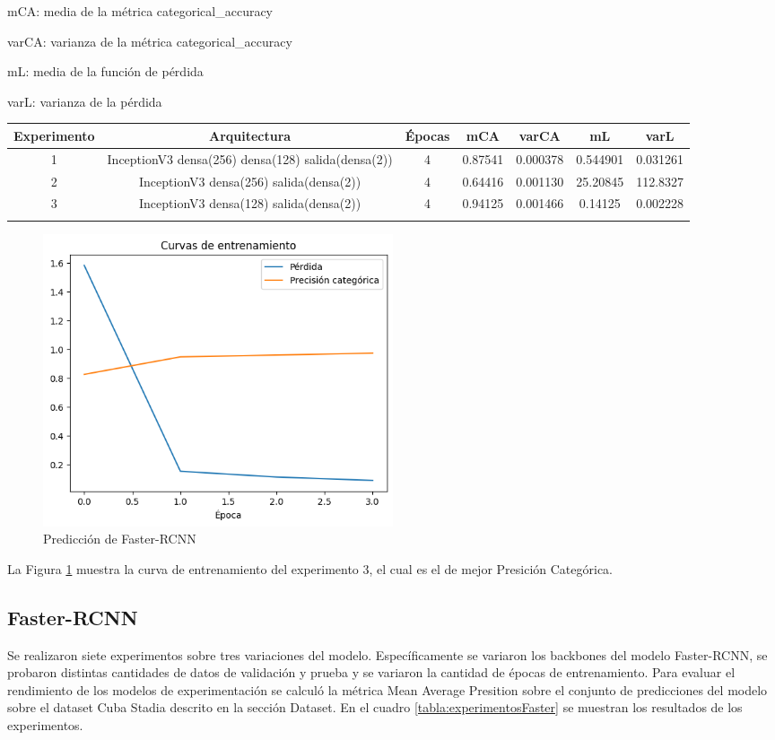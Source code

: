 \documentclass[article]{llncs}
\begin{document}
mCA: media de la métrica categorical\_accuracy

varCA: varianza de la métrica categorical\_accuracy  

mL: media de la función de pérdida

varL: varianza de la pérdida

\begin{table}[h]
    \centering
    \begin{tabular}{|c|c|c|c|c|c|c|}
    \hline
    Experimento & Arquitectura & Épocas & mCA & varCA & mL & varL \\
    \hline
    1 & InceptionV3 densa(256) densa(128) salida(densa(2)) & 4 & 0.87541 & 0.000378 & 0.544901 & 0.031261 \\
    2 & InceptionV3 densa(256) salida(densa(2)) & 4 & 0.64416 & 0.001130 & 25.20845 & 112.8327 \\
    3 & InceptionV3 densa(128) salida(densa(2)) & 4 & 0.94125 & 0.001466 & 0.14125 & 0.002228 \\
    \hline
    \label{tabla:experimentosIncep}
    \end{tabular}
\end{table}

\begin{figure}[h]
    \centering
    \includegraphics[width=0.5\textwidth]{3.png}
    \caption{Predicci\'on de Faster-RCNN}
    \label{fig:Figure_3exp}
\end{figure}

La Figura \ref{fig:Figure_3exp} muestra la curva de entrenamiento del experimento 3, el cual es el de mejor Presici\'on Categ\'orica.

\subsection{Faster-RCNN}
Se realizaron siete experimentos sobre tres variaciones del modelo. Espec\'ificamente se variaron los backbones del 
modelo Faster-RCNN, se probaron distintas cantidades de datos de validaci\'on y prueba y se variaron la cantidad de \'epocas 
de entrenamiento. Para evaluar el rendimiento de los modelos de experimentación se calcul\'o la m\'etrica Mean Average Presition sobre el conjunto 
de predicciones del modelo sobre el dataset Cuba Stadia descrito en la secci\'on Dataset.  En el cuadro \ref{tabla:experimentosFaster} se muestran los resultados de los experimentos.
\end{document}
